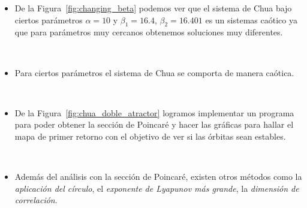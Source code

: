 \begin{frame}
	\frametitle{\secname}
	\begin{itemize}
		\item De la Figura~\ref{fig:changing_beta} podemos ver que el sistema de Chua bajo ciertos parámetros $\alpha=10$  y $\beta_{1}=16.4$, $\beta_{2}=16.401$ es un sistemas caótico ya que para parámetros muy cercanos obtenemos soluciones muy diferentes.

		      \

		\item Para ciertos parámetros el sistema de Chua se comporta de manera caótica.

		      \


		\item De la Figura~\ref{fig:chua_doble_atractor} logramos implementar un programa para poder obtener la sección de Poincaré y hacer las gráficas para hallar el mapa de primer retorno con el objetivo de ver si las órbitas sean estables.


		      \

		\item Además del análisis con la sección de Poincaré, existen otros métodos como la \emph{aplicación del círculo},
		      el \emph{exponente de Lyapunov más grande}, la \emph{dimensión de correlación}.
	\end{itemize}
\end{frame}
